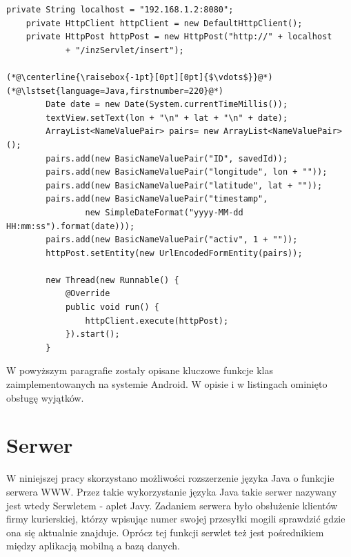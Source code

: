 \documentclass[eng,printmode,oneside]{mgr}
\begin{document}
\begin{lstlisting}[caption=Przygotowanie wiadomości do wysłania na
serwer oraz wysłanie jej,label=polaczenieSerwer] 
	private String localhost = "192.168.1.2:8080";
	private HttpClient httpClient = new DefaultHttpClient();
	private HttpPost httpPost = new HttpPost("http://" + localhost
			+ "/inzServlet/insert");
			
(*@\centerline{\raisebox{-1pt}[0pt][0pt]{$\vdots$}}@*)
(*@\lstset{language=Java,firstnumber=220}@*)
		Date date = new Date(System.currentTimeMillis()); 
		textView.setText(lon + "\n" + lat + "\n" + date); 
		ArrayList<NameValuePair> pairs= new ArrayList<NameValuePair>(); 
		pairs.add(new BasicNameValuePair("ID", savedId));
		pairs.add(new BasicNameValuePair("longitude", lon + ""));
		pairs.add(new BasicNameValuePair("latitude", lat + ""));
		pairs.add(new BasicNameValuePair("timestamp",
				new SimpleDateFormat("yyyy-MM-dd HH:mm:ss").format(date)));
		pairs.add(new BasicNameValuePair("activ", 1 + ""));
		httpPost.setEntity(new UrlEncodedFormEntity(pairs));
		
		new Thread(new Runnable() {
			@Override
			public void run() {
				httpClient.execute(httpPost);
			}).start();
		}
\end{lstlisting}

W powyższym paragrafie zostały opisane kluczowe funkcje klas zaimplementowanych
na systemie Android. W opisie i w listingach ominięto obsługę wyjątków. 

\section{Serwer}

W niniejszej pracy skorzystano możliwości rozszerzenie języka Java o funkcjie
serwera WWW. Przez takie wykorzystanie języka Java takie serwer nazywany jest
wtedy Serwletem - aplet Javy. Zadaniem serwera było obsłużenie klientów firmy
kurierskiej, którzy wpisując numer swojej przesyłki mogili sprawdzić gdzie ona
się aktualnie znajduje. Oprócz tej funkcji serwlet też jest pośrednikiem
między aplikacją mobilną a bazą danych.
\end{document}
